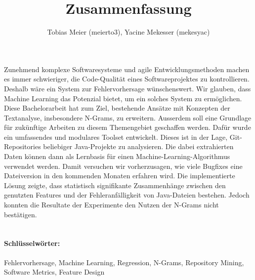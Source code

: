 \documentclass[10pt,a4paper,oneside]{article}
\author{Tobias Meier (meierto3), Yacine Mekesser (mekesyac)}
\title{\large{Zusammenfassung}}
\begin{document}
	
	\makeatletter
	\renewcommand{\maketitle}{\bgroup\setlength{\parindent}{0pt}
		\begin{flushleft}
			\textbf{\@title}
		\end{flushleft}\egroup
	}
	\makeatother
	\thispagestyle{empty}
		
	\maketitle
	Zunehmend komplexe Softwaresysteme und agile Entwicklungsmethoden machen es immer schwieriger, die Code-Qualität eines Softwareprojektes zu kontrollieren. Deshalb wäre ein System zur Fehlervorhersage wünschenswert.
	Wir glauben, dass Machine Learning das Potenzial bietet, um ein solches System zu ermöglichen.
	Diese Bachelorarbeit hat zum Ziel, bestehende Ansätze mit Konzepten der Textanalyse, insbesondere N-Grams, zu erweitern. Ausserdem soll eine Grundlage für zukünftige Arbeiten zu diesem Themengebiet geschaffen werden.
	Dafür wurde ein umfassendes und modulares Toolset entwickelt. Dieses ist in der Lage, Git-Repositories beliebiger Java-Projekte zu analysieren. Die dabei extrahierten Daten können dann als Lernbasis für einen Machine-Learning-Algorithmus verwendet werden. Damit versuchen wir vorherzusagen, wie viele Bugfixes eine Dateiversion in den kommenden Monaten erfahren wird.
	Die implementierte Lösung zeigte, dass statistisch signifikante Zusammenhänge zwischen den genutzten Features und der Fehleranfälligkeit von Java-Dateien bestehen. Jedoch konnten die Resultate der Experimente den Nutzen der N-Grams nicht bestätigen.
	\\
	\\
	\paragraph{Schlüsselwörter:} Fehlervorhersage, Machine Learning, Regression, N-Grams, Repository Mining, Software Metrics, Feature Design
\end{document}
